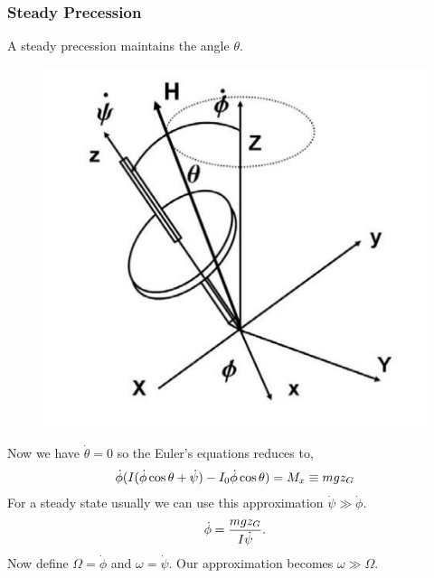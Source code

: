\documentclass[letterpaper,12pt,english]{sphinxmanual}
\begin{document}
\subsubsection{Steady Precession}
\label{picture:steady-precession}
A steady precession maintains the angle \(\theta\).
\begin{figure}[htbp]
\centering

\includegraphics{gyroscopeSteadyPrecession.png}
\end{figure}

Now we have \(\dot \theta =0\) so the Euler's equations reduces to,
\begin{gather}
\begin{split}\dot \phi  (I (\dot \phi \cos\theta +\dot \psi) - I_0\dot\phi \cos\theta) = M_x \equiv mg z_G\end{split}\notag
\end{gather}
For a steady state usually we can use this approximation \(\dot \psi \gg \dot\phi\).
\begin{gather}
\begin{split}\dot\phi = \frac{m g z_G }{I\dot\psi} .\end{split}\notag
\end{gather}
Now define \(\Omega  = \dot \phi\) and \(\omega = \dot \psi\). Our approximation becomes \(\omega \gg \Omega\).
\end{document}
